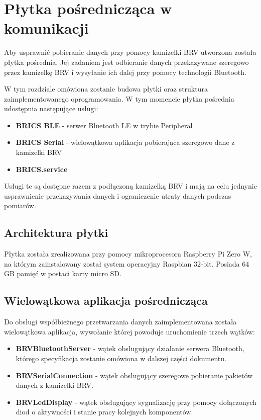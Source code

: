 \chapter{Płytka pośrednicząca w komunikacji}
    \label{middleware}
    Aby usprawnić pobieranie danych przy pomocy kamizelki BRV utworzona została płytka pośrednia.
    Jej zadaniem jest odbieranie danych przekazywane szeregowo przez kamizelkę BRV
    i wysyłanie ich dalej przy pomocy technologii Bluetooth. 
    
    W tym rozdziale omówiona zostanie budowa płytki oraz struktura zaimplementowanego oprogramowania.
    W tym momencie płytka pośrednia udostępnia następujące usługi:
    \begin{itemize}
        \item {\textbf{BRICS BLE} - serwer Bluetooth LE w trybie Peripheral}
        \item {\textbf{BRICS Serial} - wielowątkowa aplikacja pobierająca szeregowo dane z kamizelki BRV}
        \item {\textbf{BRICS.service}}
    \end{itemize}
    Usługi te są dostępne razem z podłączoną kamizelką BRV i mają na celu jednynie usprawnienie 
    przekazywania danych i ograniczenie utraty danych podczas pomiarów.

    \section {Architektura płytki}
    Płytka została zrealizowana przy pomocy mikroprocesora Raspberry Pi Zero W,
    na którym zainstalowany został system operacyjny Raspbian 32-bit. Posiada 64 GB 
    pamięć w postaci karty micro SD.

    \section {Wielowątkowa aplikacja pośrednicząca}
    Do obsługi współbieżnego przetwarzania danych zaimplementowana została wielowątkowa
    aplikacja, wywołanie której powoduje uruchomienie trzech wątków:

    \begin{itemize}
        \item{\textbf{BRVBluetoothServer} - wątek obsługujący działanie serwera 
        Bluetooth, którego specyfikacja zostanie omówiona w dalszej części dokumentu.}
        \item{\textbf{BRVSerialConnection} - wątek obsługujący szeregowe pobieranie 
        pakietów danych z kamizelki BRV.}
        \item{\textbf{BRVLedDisplay} - wątek obsługujący sygnalizację przy pomocy 
        dołączonych diod o aktywności i stanie pracy kolejnych komponentów.}
    \end{itemize}
    
